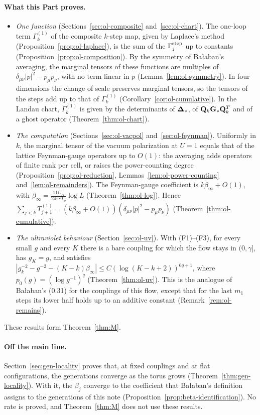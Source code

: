 \paragraph{What this Part proves.}
\begin{itemize}
\item \emph{One function} (Sections~\ref{sec:ol-composite} and~\ref{sec:ol-chart}). The one-loop term $\Gamma^{(1)}_k$ of the composite $k$-step map, given by Laplace's method (Proposition~\ref{prop:ol-laplace}), is the sum of the $\Gamma^{\rm step}_j$ up to constants (Proposition~\ref{prop:ol-composition}). By the symmetry of Ba\l aban's averaging, the marginal tensors of these functions are multiples of $\delta_{\mu\nu}|p|^2-p_\mu p_\nu$, with no term linear in $p$ (Lemma~\ref{lem:ol-symmetry}). In four dimensions the change of scale preserves marginal tensors, so the tensors of the steps add up to that of $\Gamma^{(1)}_k$ (Corollary~\ref{cor:ol-cumulative}). In the Landau chart, $\Gamma^{(1)}_k$ is given by the determinants of $\boldsymbol{\Delta}_*$, of $\mathbf Q_k\mathbf G_*\mathbf Q_k^T$ and of a ghost operator (Theorem~\ref{thm:ol-chart}).
\item \emph{The computation} (Sections~\ref{sec:ol-vacpol} and~\ref{sec:ol-feynman}). Uniformly in $k$, the marginal tensor of the vacuum polarization at $U=1$ equals that of the lattice Feynman-gauge operators up to $O(1)$: the averaging adds operators of finite rank per cell, or raises the power-counting degree (Proposition~\ref{prop:ol-reduction}, Lemmas~\ref{lem:ol-power-counting} and~\ref{lem:ol-remainders}). The Feynman-gauge coefficient is $k\beta_\infty+O(1)$, with $\beta_\infty=\frac{11C_A}{24\pi^2T_\rho}\log L$ (Theorem~\ref{thm:ol-log}). Hence $\sum_{j<k}T^{(1)}_{j+1}=(k\beta_\infty+O(1))(\delta_{\mu\nu}|p|^2-p_\mu p_\nu)$ (Theorem~\ref{thm:ol-cumulative}).
\item \emph{The ultraviolet behaviour} (Section~\ref{sec:ol-uv}). With (F1)--(F3), for every small $g$ and every $K$ there is a bare coupling for which the flow stays in $(0,\gamma]$, has $g_K=g$, and satisfies $|g_k^{-2}-g^{-2}-(K-k)\beta_\infty|\le C(\log(K-k+2))^{6q+1}$, where $p_0(g)=(\log g^{-1})^q$ (Theorem~\ref{thm:ol-uv}). This is the analogue of Ba\l aban's (0.31) for the couplings of this flow, except that for the last $m_1$ steps its lower half holds up to an additive constant (Remark~\ref{rem:ol-remains}).
\end{itemize}
These results form Theorem~\ref{thm:M}.

\paragraph{Off the main line.} Section~\ref{sec:gen-locality} proves that, at fixed couplings and at flat configurations, the generations converge as the torus grows (Theorem~\ref{thm:gen-locality}). With it, the $\beta_j$ converge to the coefficient that Ba\l aban's definition \cite[(1.20)--(1.22)]{BalYM4I} assigns to the generations of this note (Proposition~\ref{prop:beta-identification}). No rate is proved, and Theorem~\ref{thm:M} does not use these results.

